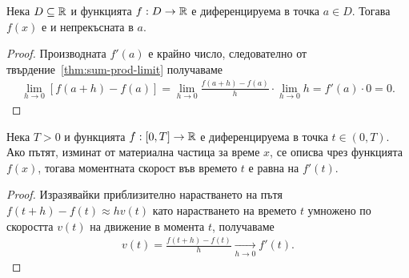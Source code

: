 \documentclass[numbers=endperiod, bibliography=totocnumbered]{scrartcl}
\begin{document}
\begin{proposition}
  Нека \( D \subseteq \mathbb{R} \) и функцията \( f: D \to \mathbb{R} \) е диференцируема в точка \( a \in D \). Тогава \( f(x) \) е и непрекъсната в \( a \).
\end{proposition}
\begin{proof}
  Производната \( f'(a) \) е крайно число, следователно от твърдение~\ref{thm:sum-prod-limit} получаваме
  \begin{align*}
    \lim_{h \to 0} [f(a+h) - f(a)]
    =
    \lim_{h \to 0} \frac {f(a+h) - f(a)} h \cdot \lim_{h \to 0} h
    =
    f'(a) \cdot 0
    =
    0.
  \end{align*}
\end{proof}

\begin{theorem}
  Нека \( T > 0 \) и функцията \( f: [0, T] \to \mathbb{R} \) е диференцируема в точка \( t \in (0, T) \). Ако пътят, изминат от материална частица за време \( x \), се описва чрез функцията \( f(x) \), тогава моментната скорост във времето \( t \) е равна на \( f'(t) \).
\end{theorem}
\begin{proof}
  Изразявайки приблизително нарастването на пътя \( f(t+h) - f(t) \approx h v(t) \) като нарастването на времето \( t \) умножено по скоростта \( v(t) \) на движение в момента \( t \), получаваме
  \begin{align*}
    v(t) = \frac{f(t+h) - f(t)} {h} \underset {h \to 0} \longrightarrow f'(t).
  \end{align*}
\end{proof}
\end{document}
